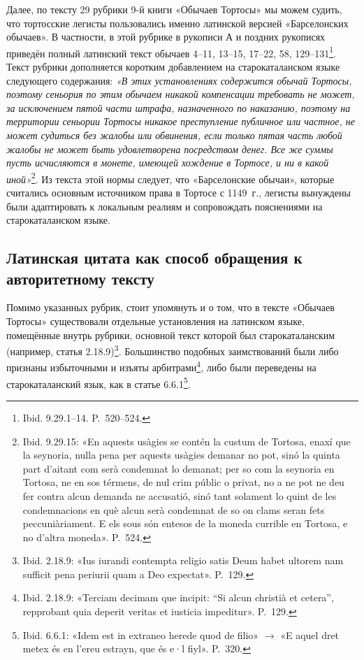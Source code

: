 Далее, по тексту 29 рубрики 9-й книги «Обычаев Тортосы» мы можем судить, что тортосские легисты пользовались именно латинской версией «Барселонских обычаев». В частности, в этой рубрике в рукописи А и поздних рукописях приведён полный латинский текст обычаев 4--11, 13--15, 17--22, 58, 129--131\footnote{Ibid. 9.29.1--14. P.~520--524.}. Текст рубрики дополняется коротким добавлением на старокаталанском языке следующего содержания: \emph{«В этих установлениях содержится обычай Тортосы, поэтому сеньория по этим обычаем никакой компенсации требовать не может, за исключением пятой части штрафа, назначенного по наказанию, поэтому на территории сеньории Тортосы никакое преступление публичное или частное, не может судиться без жалобы или обвинения, если только пятая часть }\emph{любой жалобы не может быть удовлетворена посредством денег. Все же суммы пусть исчисляются в монете, имеющей хождение в Тортосе, и ни в какой иной»}\footnote{Ibid. 9.29.15: «En aquests usàgies se contén la custum de Tortosa, enaxí que la seynoria, nulla pena per aquests usàgies demanar no pot, sinó la quinta part d’aitant com serà condemnat lo demanat; per so com la seynoria en Tortosa, ne en sos térmens, de nul crim públic o privat, no a ne pot ne deu fer contra alcun demanda ne accusatió, sinó tant solament lo quint de les condemnacions en què alcun serà condemnat de so on clams seran fets peccuniàriament. E els sous són entesos de la moneda currible en Tortosa, e no d’altra moneda». P.~524.}. Из текста этой нормы следует, что «Барселонские обычаи», которые считались основным источником права в Тортосе с 1149~г., легисты вынуждены были адаптировать к локальным реалиям и сопровождать пояснениями на старокаталанском языке.

\subsection{Латинская цитата как способ обращения к авторитетному тексту}

Помимо указанных рубрик, стоит упомянуть и о том, что в тексте «Обычаев Тортосы» существовали отдельные установления на латинском языке, помещённые внутрь рубрики, основной текст которой был старокаталанским (например, статья 2.18.9)\footnote{Ibid. 2.18.9: «Ius iurandi contempta religio satis Deum habet ultorem nam sufficit pena periurii quam a Deo expectat». P.~129.}. Большинство подобных заимствований были либо признаны избыточными и изъяты арбитрами\footnote{Ibid. 2.18.9: «Terciam decimam que incipit: “Si alcun christià et cetera”, repprobant quia deperit veritas et iusticia impeditur». P.~129.}, либо были переведены на старокаталанский язык, как в статье 6.6.1\footnote{Ibid. 6.6.1: «Idem est in extraneo herede quod de filio» $\rightarrow$ «E aquel dret metex és en l’ereu estrayn, que és e·l fiyl». P.~320.}.

